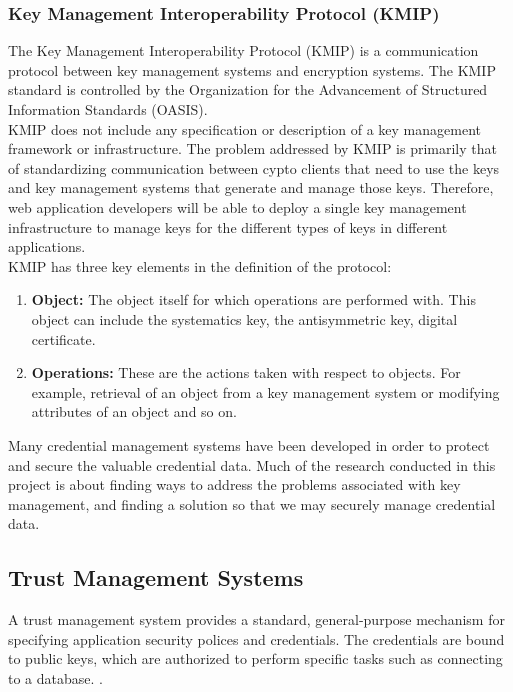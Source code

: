 \documentclass[11pt, a4paper, twoside, notitlepage]{article}
\begin{document}
\subsubsection*{Key Management Interoperability Protocol (KMIP)}
The Key Management Interoperability Protocol (KMIP) is a communication protocol between key management systems and encryption systems. The KMIP standard is controlled by the Organization for the Advancement of Structured Information Standards (OASIS). \\

KMIP does not include any specification or description of a key management framework or infrastructure. The problem addressed by KMIP is primarily that of standardizing communication between cypto clients that need to use the keys and key management systems that generate and manage those keys. Therefore, web application developers will be able to deploy a single key management infrastructure to manage keys for the different types of keys in different applications. \\

KMIP has three key elements in the definition of the protocol:
\begin{enumerate}
\item \textbf{Object:} The object itself for which operations are performed with. This object can include the systematics key, the antisymmetric key, digital certificate.
\item \textbf{Operations:} These are the actions taken with respect to objects. For example, retrieval of an object from a key management system or modifying attributes of an object and so on.
\end{enumerate}

Many credential management systems have been developed in order to protect and secure the valuable credential data. Much of the research conducted in this project is about finding ways to address the problems associated with key management, and finding a solution so that we may securely manage credential data. \\

\subsection*{Trust Management Systems}
A trust management system provides a standard, general-purpose mechanism for specifying application security polices and credentials.
The credentials are bound to public keys, which are authorized to perform specific tasks such as connecting to a database. \cite{blaze1999keynote}. \\
\end{document}
